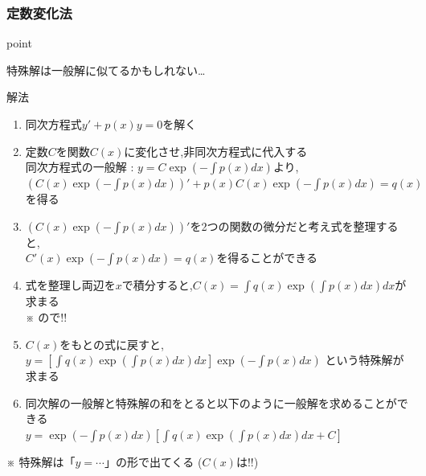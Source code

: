 \documentclass[a4paper]{jsarticle}
\begin{document}
\subsubsection{定数変化法}
\begin{itembox}[l]{point}
    \begin{center}
        特殊解は一般解に似てるかもしれない\dots
    \end{center}
\end{itembox}
\begin{itembox}[l]{解法}
    \begin{enumerate}[(1)]
        \item 同次方程式$y'+p\left(x\right)y=0$を解く
        \item 定数$C$を関数$C\left(x\right)$に変化させ,非同次方程式に代入する\\
              同次方程式の一般解 : $y=C\exp\left(-\int p\left(x\right)dx\right)$より,\\
              $\left(C\left(x\right)\exp\left(-\int p\left(x\right)dx\right)\right)'+p\left(x\right)C\left(x\right)\exp\left(-\int p\left(x\right)dx\right)=q\left(x\right)$を得る
        \item $\left(C\left(x\right)\exp\left(-\int p\left(x\right)dx\right)\right)'$を2つの関数の微分だと考え式を整理すると,\\
              $C'\left(x\right)\exp\left(-\int p\left(x\right)dx\right)=q\left(x\right)$を得ることができる
        \item 式を整理し両辺を$x$で積分すると,$C\left(x\right)=\int q\left(x\right)\exp\left(\int p\left(x\right)dx\right)dx$が求まる\\
              ※ ので!!
        \item $C\left(x\right)$をもとの式に戻すと,$y=\left[\int q\left(x\right)\exp\left(\int p\left(x\right)dx\right)dx\right]\exp\left(-\int p\left(x\right)dx\right)$
              という特殊解が求まる
        \item 同次解の一般解と特殊解の和をとると以下のように一般解を求めることができる\\
              $y=\exp\left(-\int p\left(x\right)dx\right)\left[\int q\left(x\right)\exp\left(\int p\left(x\right)dx\right)dx+C\right]$
    \end{enumerate}
\end{itembox}
※ 特殊解は「$y=\cdots$」の形で出てくる ($C\left(x\right)$は!!)\\
\end{document}
